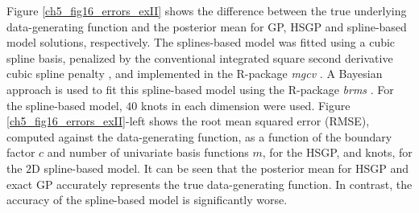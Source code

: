 



Figure \ref{ch5_fig16_errors_exII} shows the difference  between the true underlying data-generating function and the posterior mean for GP, HSGP and spline-based model solutions, respectively. The splines-based model was fitted using a cubic spline basis, penalized by the conventional integrated square second derivative cubic spline penalty \citep{wood2017generalized}, and implemented in the R-package \textit{mgcv} \citep{wood2011mgcv}. A Bayesian approach is used to fit this spline-based model using the R-package \textit{brms} \citep{burkner2017brms}. For the spline-based model, $40$ knots in each dimension were used. Figure \ref{ch5_fig16_errors_exII}-left shows the root mean squared error (RMSE), computed against the data-generating function, as a function of the boundary factor $c$ and number of univariate basis functions $m$, for the HSGP, and knots, for the $2$D spline-based model. It can be seen that the posterior mean for HSGP and exact GP accurately represents the true data-generating function. In contrast, the accuracy of the spline-based model is significantly worse. 


